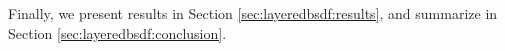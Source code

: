 

Finally, we present results in Section \ref{sec:layeredbsdf:results}, and summarize in Section \ref{sec:layeredbsdf:conclusion}.

%
%
%
%
